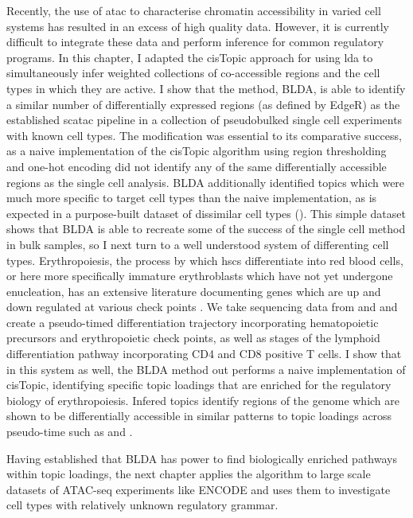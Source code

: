 Recently, the use of \gls{atac} to characterise chromatin accessibility in varied cell systems has resulted in an excess of high quality data. However, it is currently difficult to integrate these data and perform inference for common regulatory programs. In this chapter, I adapted the cisTopic approach for using \gls{lda} to simultaneously infer weighted collections of co-accessible regions and the cell types in which they are active. I show that the method, BLDA, is able to identify a similar number of differentially expressed regions (as defined by EdgeR) as the established \gls{scatac} pipeline in a collection of pseudobulked single cell experiments with known cell types. The modification was essential to its comparative success, as a naive implementation of the cisTopic algorithm using region thresholding and one-hot encoding did not identify any of the same differentially accessible regions as the single cell analysis. BLDA additionally identified topics which were much more specific to target cell types than the naive implementation, as is expected in a purpose-built dataset of dissimilar cell types (). This simple dataset shows that BLDA is able to recreate some of the success of the single cell method in bulk samples, so I next turn to a well understood system of differenting cell types. Erythropoiesis, the process by which \glspl{hsc} differentiate into red blood cells, or here more specifically immature erythroblasts which have not yet undergone enucleation, has an extensive literature documenting genes which are up and down regulated at various check points \cite{Ludwig2019}. We take sequencing data from \textcite{Ludwig2019} and \textcite{Corces2016} and create a pseudo-timed differentiation trajectory incorporating hematopoietic precursors and erythropoietic check points, as well as stages of the lymphoid differentiation pathway incorporating CD4 and CD8 positive T cells. I show that in this system as well, the BLDA method out performs a naive implementation of cisTopic, identifying specific topic loadings that are enriched for the regulatory biology of erythropoiesis. Infered topics identify regions of the genome which are shown to be differentially accessible in similar patterns to topic loadings across pseudo-time such as  and . 

Having established that BLDA has power to find biologically enriched pathways within topic loadings, the next chapter applies the algorithm to large scale datasets of ATAC-seq experiments like ENCODE and uses them to investigate cell types with relatively unknown regulatory grammar.  

